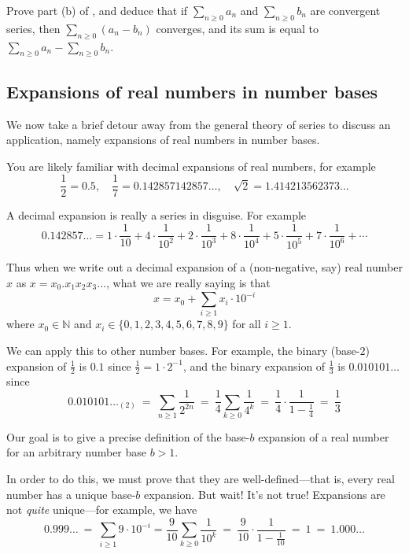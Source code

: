 \begin{exercise}
Prove part (b) of , and deduce that if $\displaystyle \sum_{n \ge 0} a_n$ and $\displaystyle \sum_{n \ge 0} b_n$ are convergent series, then $\displaystyle \sum_{n \ge 0} (a_n - b_n)$ converges, and its sum is equal to $\displaystyle \sum_{n \ge 0} a_n - \sum_{n \ge 0} b_n$.
\end{exercise}

\subsection*{Expansions of real numbers in number bases}

We now take a brief detour away from the general theory of series to discuss an application, namely expansions of real numbers in number bases.

You are likely familiar with decimal expansions of real numbers, for example
\[ \frac{1}{2} = 0.5, \quad \dfrac{1}{7} = 0.142857142857\dots{}, \quad \sqrt{2} = 1.414213562373\dots{} \]

A decimal expansion is really a series in disguise. For example
\[ 0.142857\dots{} = 1 \cdot \frac{1}{10} + 4 \cdot \frac{1}{10^2} + 2 \cdot \frac{1}{10^3} + 8 \cdot \frac{1}{10^4} + 5 \cdot \frac{1}{10^5} + 7 \cdot \frac{1}{10^6} + \cdots \]

Thus when we write out a decimal expansion of a (non-negative, say) real number $x$ as $x=x_0.x_1x_2x_3\dots{}$, what we are really saying is that
\[ x = x_0 + \sum_{i \ge 1} x_i \cdot 10^{-i} \]
where $x_0 \in \mathbb{N}$ and $x_i \in \{ 0,1,2,3,4,5,6,7,8,9 \}$ for all $i \ge 1$.

We can apply this to other number bases. For example, the binary (base-$2$) expansion of $\frac{1}{2}$ is $0.1$ since $\frac{1}{2} = 1 \cdot 2^{-1}$, and the binary expansion of $\frac{1}{3}$ is $0.010101\dots{}$ since
\[ 0.010101\dots{}_{(2)} ~=~ \sum_{n \ge 1} \frac{1}{2^{2n}} ~=~ \frac{1}{4} \sum_{k \ge 0} \frac{1}{4^k} ~=~ \frac{1}{4} \cdot \frac{1}{1-\frac{1}{4}} ~=~ \frac{1}{3} \]

Our goal is to give a precise definition of the base-$b$ expansion of a real number for an arbitrary number base $b > 1$.

In order to do this, we must prove that they are well-defined---that is, every real number has a unique base-$b$ expansion. But wait! It's not true! Expansions are not \textit{quite} unique---for example, we have
\[ 0.999\dots{} ~=~ \sum_{i \ge 1} 9 \cdot 10^{-i} = \dfrac{9}{10} \sum_{k \ge 0} \dfrac{1}{10^k} ~=~ \dfrac{9}{10} \cdot \dfrac{1}{1-\frac{1}{10}} ~=~ 1 ~=~ 1.000\dots{} \]

